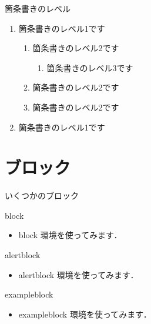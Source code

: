 \begin{frame}{箇条書きのレベル}
  \begin{enumerate}
    \item 箇条書きのレベル1です
    \begin{enumerate}
      \item 箇条書きのレベル2です
      \begin{enumerate}
        \item 箇条書きのレベル3です
      \end{enumerate}
      \item 箇条書きのレベル2です
      \item 箇条書きのレベル2です
    \end{enumerate}
    \item 箇条書きのレベル1です
  \end{enumerate}
\end{frame}


\section{ブロック}

\begin{frame}{いくつかのブロック}
  \begin{block}{block}
    \begin{itemize}
      \item block 環境を使ってみます．
    \end{itemize}
  \end{block}
  \begin{alertblock}{alertblock}
    \begin{itemize}
      \item alertblock 環境を使ってみます．
    \end{itemize}
  \end{alertblock}
  \begin{exampleblock}{exampleblock}
    \begin{itemize}
      \item exampleblock 環境を使ってみます．
    \end{itemize}
  \end{exampleblock}
\end{frame}


